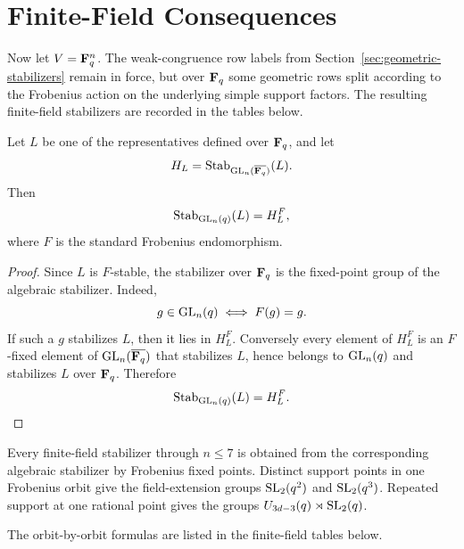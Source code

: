 \section{Finite-Field Consequences}
\label{sec:finite-fields}

Now let \(V=\mathbf F_q^n\). The weak-congruence row labels from
Section~\ref{sec:geometric-stabilizers} remain in force, but over \(\mathbf F_q\) some
geometric rows split according to the Frobenius action on the underlying simple
support factors. The resulting finite-field stabilizers are recorded in the
tables below.

\begin{proposition}
\label{prop:fixed-points-rewrite}
Let \(L\) be one of the representatives defined over \(\mathbf F_q\), and let
\[
  H_L=\mathrm{Stab}_{\mathrm{GL}_n(\overline{\mathbf F_q})}(L).
\]
Then
\[
  \mathrm{Stab}_{\mathrm{GL}_n(q)}(L)=H_L^F,
\]
where \(F\) is the standard Frobenius endomorphism.
\end{proposition}

\begin{proof}
Since \(L\) is \(F\)-stable, the stabilizer over \(\mathbf F_q\) is the fixed-point
group of the algebraic stabilizer. Indeed,
\[
  g\in \mathrm{GL}_n(q)
  \iff
  F(g)=g.
\]
If such a \(g\) stabilizes \(L\), then it lies in \(H_L^F\). Conversely every
element of \(H_L^F\) is an \(F\)-fixed element of \(\mathrm{GL}_n(\overline{\mathbf F_q})\) that
stabilizes \(L\), hence belongs to \(\mathrm{GL}_n(q)\) and stabilizes \(L\) over
\(\mathbf F_q\). Therefore
\[
  \mathrm{Stab}_{\mathrm{GL}_n(q)}(L)=H_L^F.
\]
\end{proof}

\begin{proposition}
\label{prop:finite-stabilizers-rewrite}
Every finite-field stabilizer through \(n\le 7\) is obtained from the
corresponding algebraic stabilizer by Frobenius fixed points. Distinct support
points in one Frobenius orbit give the field-extension groups
\(\mathrm{SL}_2(q^2)\) and \(\mathrm{SL}_2(q^3)\). Repeated support at one rational point gives
the groups \(U_{3d-3}(q)\rtimes \mathrm{SL}_2(q)\).

The orbit-by-orbit formulas are listed in the finite-field tables below.
\end{proposition}

